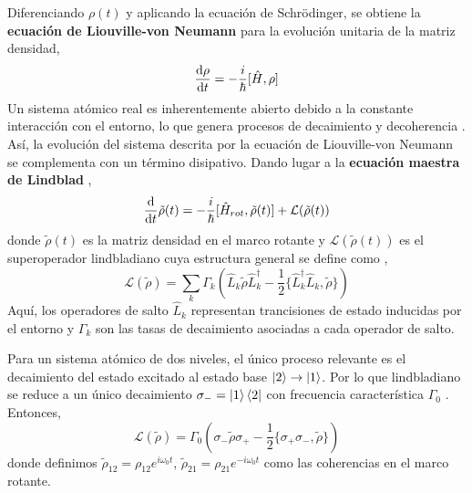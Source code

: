 Diferenciando $\rho(t)$ y aplicando la ecuación de Schrödinger, se obtiene la \textbf{ecuación de Liouville-von Neumann} para la evolución unitaria de la matriz densidad,
\begin{equation*}
    \odv{\rho}{t} = - \frac{i}{\hbar} [\hat{H}, \rho]
\end{equation*}
Un sistema atómico real es inherentemente abierto debido a la constante interacción con el entorno, lo que genera procesos de decaimiento y decoherencia \cite{footAtomicPhysics2005}. Así, la evolución del sistema descrita por la ecuación de Liouville-von Neumann se complementa con un término disipativo. Dando lugar a la \textbf{ecuación maestra de Lindblad} \cite{lindbladGeneratorsQuantumDynamical1976,keaveneyAtomLightInteractions2014},
\begin{equation}
    \odv{}{t} \tilde{\rho}(t) = -\frac{i}{\hbar} [\hat{H}_{rot}, \tilde{\rho}(t)] + \mathcal{L}(\tilde{\rho}(t))
    \label{eq:maestra_lindblad}
\end{equation}
donde $\tilde{\rho}(t)$ es la matriz densidad en el marco rotante y $\mathcal{L}(\tilde{\rho}(t))$ es el superoperador lindbladiano cuya estructura general se define como \cite{lindbladGeneratorsQuantumDynamical1976},
\begin{equation*}
    \mathcal{L}(\tilde{\rho}) = \sum_k \Gamma_k \left( \hat{L}_k \tilde{\rho} \hat{L}_k^{\dagger} - \frac{1}{2} \{\hat{L}_k^{\dagger} \hat{L}_k, \tilde{\rho}\} \right)
\end{equation*}
Aquí, los operadores de salto $\hat{L}_k$ representan trancisiones de estado inducidas por el entorno y $\Gamma_k$ son las tasas de decaimiento asociadas a cada operador de salto.

Para un sistema atómico de dos niveles, el único proceso relevante es el decaimiento del estado excitado al estado base $\ket{2} \to \ket{1}$. Por lo que lindbladiano se reduce a un único decaimiento $\sigma_- =\ket{1}\bra{2}$ con frecuencia característica $\Gamma_0$ \cite{gerryIntroductoryQuantumOptics, siddonsAbsoluteAbsorptionRubidium2008, keaveneyAtomLightInteractions2014}. Entonces,
\begin{equation}
    \mathcal{L}(\tilde{\rho}) = \Gamma_0 \left( \sigma_- \tilde{\rho} \sigma_+ - \frac{1}{2} \{\sigma_+ \sigma_-, \tilde{\rho}\} \right)
\end{equation}
donde definimos $\tilde{\rho}_{12}= \rho_{12} e^{i \omega_0 t}$,  $\tilde{\rho}_{21}= \rho_{21} e^{-i \omega_0 t}$ como las coherencias en el marco rotante.

